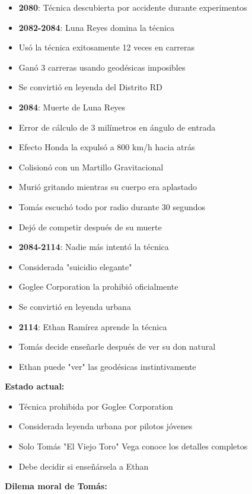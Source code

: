 \documentclass[11pt,a4paper]{report}
\begin{document}
\begin{itemize}
  \item \textbf{2080}: Técnica descubierta por accidente durante experimentos
  \item \textbf{2082-2084}: Luna Reyes domina la técnica
  \item Usó la técnica exitosamente 12 veces en carreras
  \item Ganó 3 carreras usando geodésicas imposibles
  \item Se convirtió en leyenda del Distrito RD
  \item \textbf{2084}: Muerte de Luna Reyes
  \item Error de cálculo de 3 milímetros en ángulo de entrada
  \item Efecto Honda la expulsó a 800 km/h hacia atrás
  \item Colisionó con un Martillo Gravitacional
  \item Murió gritando mientras su cuerpo era aplastado
  \item Tomás escuchó todo por radio durante 30 segundos
  \item Dejó de competir después de su muerte
  \item \textbf{2084-2114}: Nadie más intentó la técnica
  \item Considerada "suicidio elegante"
  \item Goglee Corporation la prohibió oficialmente
  \item Se convirtió en leyenda urbana
  \item \textbf{2114}: Ethan Ramírez aprende la técnica
  \item Tomás decide enseñarle después de ver su don natural
  \item Ethan puede "ver" las geodésicas instintivamente

\end{itemize}
\textbf{Estado actual:}

\begin{itemize}
  \item Técnica prohibida por Goglee Corporation
  \item Considerada leyenda urbana por pilotos jóvenes
  \item Solo Tomás "El Viejo Toro" Vega conoce los detalles completos
  \item Debe decidir si enseñársela a Ethan

\end{itemize}
\textbf{Dilema moral de Tomás:}
\end{document}
